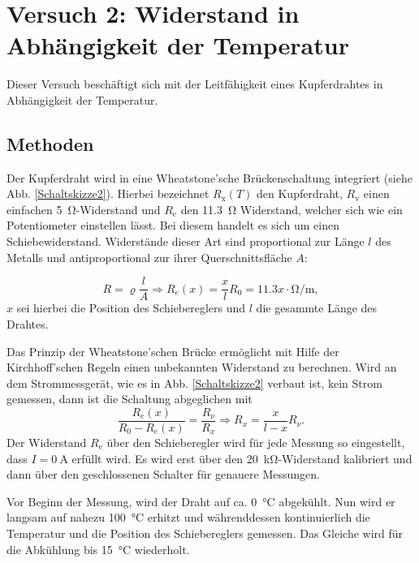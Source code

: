 \documentclass[11pt,a4paper,titlepage, ngerman]{article}
\begin{document}
	\newpage	
	\section{Versuch 2: Widerstand in Abhängigkeit der Temperatur}		
		
		Dieser Versuch beschäftigt sich mit der Leitfähigkeit eines Kupferdrahtes in Abhängigkeit der Temperatur.
		
		\subsection{Methoden} 
		
			Der Kupferdraht wird in eine Wheatstone'sche Brückenschaltung integriert (siehe Abb. \ref{Schaltskizze2}). Hierbei bezeichnet $R_\text{x}(T)$ den Kupferdraht, $R_\text{v}$ einen einfachen \SI{5}{\ohm}-Widerstand und $R_\text{e}$ den \SI{11,3}{\ohm} Widerstand, welcher sich wie ein Potentiometer einstellen lässt. Bei diesem handelt es sich um einen Schiebewiderstand. Widerstände dieser Art sind proportional zur Länge $l$ des Metalls und antiproportional zur ihrer Querschnittsfläche $A$:
			
			\begin{equation*}
				R = \varrho \frac{l}{A} \Rightarrow R_e(x) = \frac{x}{l} R_0 = \SI{11,3} x \cdot \si{\ohm\per\meter},
			\end{equation*}				
			$x$ sei hierbei die Position des Schiebereglers und $l$ die gesammte Länge des Drahtes.	
			
			Das Prinzip der Wheatstone'schen Brücke ermöglicht mit Hilfe der Kirchhoff'schen Regeln einen unbekannten Widerstand zu berechnen.
			Wird an dem Strommessgerät, wie es in Abb. \ref{Schaltskizze2} verbaut ist, kein Strom gemessen, dann ist die Schaltung abgeglichen mit
			\begin{equation*}
				\frac{R_e(x)}{R_0-R_e(x)} = \frac{R_\nu}{R_x} \Rightarrow R_x = \frac{x}{l-x} R_\nu.
			\end{equation*}
			Der Widerstand $R_\text{e}$ über den Schieberegler wird für jede Messung so eingestellt, dass $I = \SI{0}{\ampere}$ erfüllt wird. Es wird erst über den \SI{20}{\kilo\ohm}-Widerstand kalibriert und dann über den geschlossenen Schalter für genauere Messungen.
			
			Vor Beginn der Messung, wird der Draht auf ca. \SI{0}{\celsius} abgekühlt.
			Nun wird er langsam auf nahezu \SI{100}{\celsius} erhitzt und währenddessen kontinuierlich die Temperatur und die Position des Schiebereglers gemessen.
			Das Gleiche wird für die Abkühlung bis \SI{15}{\celsius} wiederholt.
						
\end{document}
